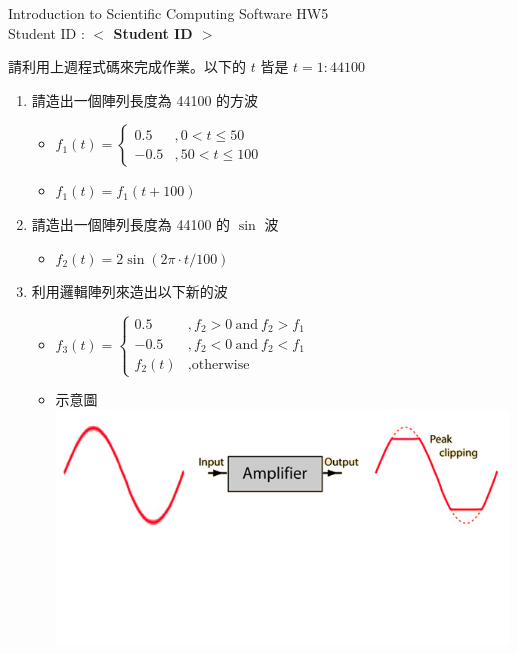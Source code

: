 \documentclass[12pt,a4paper]{article}
\newcommand{\placeholder}[1]{\textbf{$<$ #1 $>$}}
\newcommand{\idnumber}{\placeholder{Student ID}}
\begin{document}
\begin{CJK}{UTF8}{bsmi}
\begin{flushleft}Introduction to Scientific Computing Software HW5
\\Student ID : \idnumber{}\end{flushleft}

請利用上週程式碼來完成作業。以下的 $t$ 皆是 $t=1:44100$
\begin{enumerate}
\item 請造出一個陣列長度為 44100 的方波
\begin{itemize} 


\item $f_1(t)=\left\{\begin{array}{ll}0.5&,0 < t\le50 \\ -0.5 &,50 < t \le 100\end{array}\right.$
\item $f_1(t)=f_1(t+100)$
\end{itemize}
\item 請造出一個陣列長度為 44100 的 $\sin$ 波
\begin{itemize}

\item $f_2(t)=2\sin(2\pi \cdot t/100)$
\end{itemize}

\item 利用邏輯陣列來造出以下新的波
\begin{itemize}

\item $f_3(t)=\left\{\begin{array}{ll}0.5&, f_2>0\ \mbox{and}\ f_2>f_1 \\ -0.5 &,f_2<0\ \mbox{and}\ f_2<f_1 \\f_2(t) & ,\mbox{otherwise} \end{array}\right.$
\item 示意圖 \\ \includegraphics[width=12cm]{amp2-1}
\end{itemize}
\end{enumerate}
\end{CJK}
\end{document}
